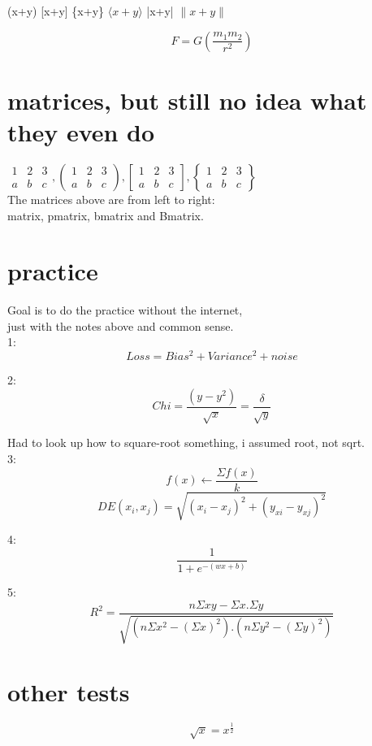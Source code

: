 \documentclass[12p]{article}
\begin{document}
(x+y)
[x+y]
\{x+y\}
$\langle x+y \rangle$
|x+y|
$\|x+y\|$


\[
F=G \left(\frac{m_1 m_2}{r^2} \right )
\]


\section{matrices, but still no idea what they even do}
$
\begin{matrix}
1 & 2 & 3\\
a & b & c
\end{matrix},
\begin{pmatrix}
1 & 2 & 3\\
a & b & c
\end{pmatrix},
\begin{bmatrix}
1 & 2 & 3\\
a & b & c
\end{bmatrix},
\begin{Bmatrix}
1 & 2 & 3\\
a & b & c
\end{Bmatrix}
$\\
The matrices above are from left to right:\\ matrix, pmatrix, bmatrix and Bmatrix.


\section{practice}
Goal is to do the practice without the internet,\\
just with the notes above and common sense.\\

1:
\[Loss=Bias^2+Variance^2+noise\]

2:
\[Chi
=\frac{(y-y^2)}{\sqrt{x}}
=\frac{\delta}{\sqrt{y}}\]

Had to look up how to square-root something, i assumed root, not sqrt.
\\
3:
\[f(x)\leftarrow \frac{\Sigma f(x)}{k}\]
\[DE(x_i ,x_j)=\sqrt{(x_i -x_j)^2+(y_{xi}-y_{xj})^2}\]

4:
\[\frac{1}{1+e^{-(wx+b)}}\]

5:
\[R^2=\frac{n \Sigma xy - \Sigma x.\Sigma y}{\sqrt{(n \Sigma x^2 -(\Sigma x)^2).
(n \Sigma y^2-(\Sigma y)^2)}}\]


\section*{other tests}
\[\sqrt{x}=x^{\frac{1}{2}}\]
\end{document}

